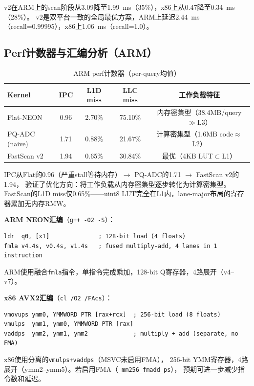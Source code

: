 \documentclass[11pt,a4paper]{article}
\begin{document}
v2在ARM上的scan阶段从3.09降至1.99~ms（35\%），x86上从0.47降至0.34~ms（28\%）。
v2是双平台一致的全局最优方案，ARM上延迟2.44~ms（recall=0.99995），x86上1.06~ms（recall=1.0）。

\subsection{Perf计数器与汇编分析（ARM）}

\begin{table}[H]
\centering
\caption{ARM perf计数器（per-query均值）}
\label{tab:perf}
\small
\begin{tabular}{lcccc}
\toprule
\textbf{Kernel} & \textbf{IPC} & \textbf{L1D miss} & \textbf{LLC miss} & \textbf{工作负载特征} \\
\midrule
Flat-NEON       & 0.96 & 2.70\% & 75.10\% & 内存密集型（38.4MB/query$\gg$L3）\\
PQ-ADC (naive)  & 1.71 & 0.88\% & 21.67\% & 计算密集型（1.6MB code$\approx$L2）\\
FastScan v2     & 1.94 & 0.65\% & 30.84\% & 最优（4KB LUT$\subset$L1）\\
\bottomrule
\end{tabular}
\end{table}

IPC从Flat的0.96（严重stall等待内存）$\to$ PQ-ADC的1.71 $\to$ FastScan v2的1.94，
验证了优化方向：将工作负载从内存密集型逐步转化为计算密集型。
FastScan的L1D miss仅0.65\%——uint8 LUT完全在L1内，lane-major布局的寄存器累加无内存RMW。

\textbf{ARM NEON汇编}（\texttt{g++ -O2 -S}）：
\begin{lstlisting}[language={[x86masm]Assembler},numbers=none]
ldr  q0, [x1]              ; 128-bit load (4 floats)
fmla v4.4s, v0.4s, v1.4s   ; fused multiply-add, 4 lanes in 1 instruction
\end{lstlisting}
ARM使用融合\texttt{fmla}指令，单指令完成乘加，128-bit Q寄存器，4路展开（v4--v7）。

\textbf{x86 AVX2汇编}（\texttt{cl /O2 /FAcs}）：
\begin{lstlisting}[language={[x86masm]Assembler},numbers=none]
vmovups ymm0, YMMWORD PTR [rax+rcx]  ; 256-bit load (8 floats)
vmulps  ymm1, ymm0, YMMWORD PTR [rax]
vaddps  ymm2, ymm1, ymm2             ; multiply + add (separate, no FMA)
\end{lstlisting}
x86使用分离的\texttt{vmulps+vaddps}（MSVC未启用FMA），
256-bit YMM寄存器，4路展开（ymm2--ymm5）。若启用FMA（\texttt{\_mm256\_fmadd\_ps}），
预期可进一步减少指令数和延迟。
\end{document}
